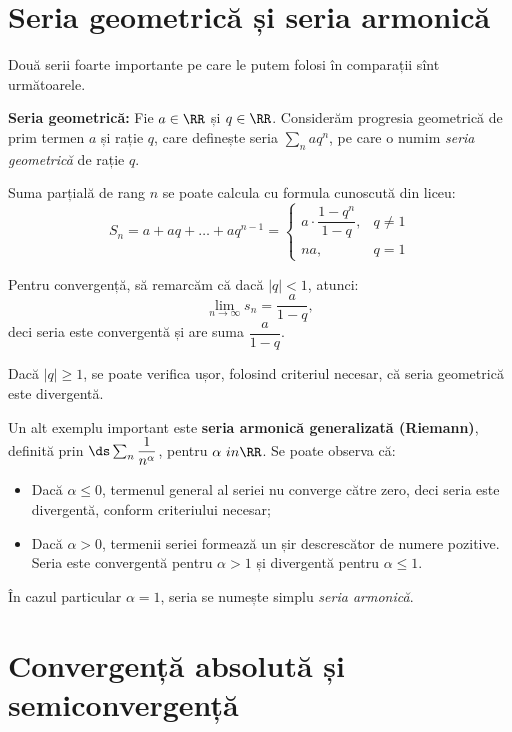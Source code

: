 
\section{Seria geometrică și seria armonică}

Două serii foarte importante pe care le putem folosi în comparații sînt
următoarele.

\textbf{Seria geometrică:} Fie $ a \in \RR $ și $ q \in \RR $. Considerăm
progresia geometrică de prim termen $ a $ și rație $ q $, care definește
seria $ \sum_n aq^n $, pe care o numim \emph{seria geometrică} de rație $ q $.

Suma parțială de rang $ n $ se poate calcula cu formula cunoscută din liceu:
\[
  S_n = a + aq + \dots + aq^{n-1} = %
  \begin{cases}
    a \cdot \dfrac{1 - q^n}{1 - q}, & q \neq 1 \\
    na, & q = 1
  \end{cases}
\]

Pentru convergență, să remarcăm că dacă $ |q| < 1 $, atunci:
\[
  \lim_{n \to \infty} s_n = \frac{a}{1 - q},
\]
deci seria este convergentă și are suma $ \dfrac{a}{1 - q} $.

Dacă $ |q| \geq 1 $, se poate verifica ușor, folosind criteriul
necesar, că seria geometrică este divergentă.

Un alt exemplu important este \textbf{seria armonică generalizată (Riemann)},
definită prin $ \ds\sum_n \dfrac{1}{n^\alpha} $, pentru $ \alpha \ in \RR $.
Se poate observa că:
\begin{itemize}
\item Dacă $ \alpha \leq 0 $, termenul general al seriei nu converge către
  zero, deci seria este divergentă, conform criteriului necesar;
\item Dacă $ \alpha > 0 $, termenii seriei formează un șir descrescător de
  numere pozitive. Seria este convergentă pentru $ \alpha > 1 $ și
  divergentă pentru $ \alpha \leq 1 $.
\end{itemize}

În cazul particular $ \alpha = 1 $, seria se numește simplu \emph{seria armonică}.


\section{Convergență absolută și semiconvergență}

